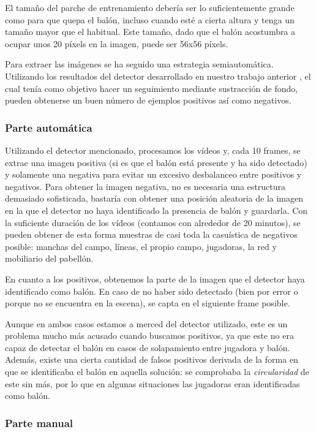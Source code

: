 El tamaño del parche de entrenamiento debería ser lo suficientemente grande como para que quepa el balón, incluso cuando esté a cierta altura y tenga un tamaño mayor que el habitual. Este tamaño, dado que el balón acostumbra a ocupar unos 20 píxels en la imagen, puede ser 56x56 píxels.

Para extraer las imágenes se ha seguido una estrategia semiautomática. Utilizando los resultados del detector desarrollado en nuestro trabajo anterior \cite{tfg}, el cual tenía como objetivo hacer un seguimiento mediante sustracción de fondo, pueden obtenerse un buen número de ejemplos positivos así como negativos.

\subsubsection*{Parte automática}

Utilizando el detector mencionado, procesamos los vídeos y, cada 10 frames, se extrae una imagen positiva (si es que el balón está presente y ha sido detectado) y solamente una negativa para evitar un excesivo desbalanceo entre positivos y negativos. Para obtener la imagen negativa, no es necesaria una estructura demasiado sofisticada, bastaría con obtener una posición aleatoria de la imagen en la que el detector no haya identificado la presencia de balón y guardarla. Con la suficiente duración de los vídeos (contamos con alrededor de 20 minutos), se pueden obtener de esta forma muestras de casi toda la casuística de negativos posible: manchas del campo, líneas, el propio campo, jugadoras, la red y mobiliario del pabellón.

En cuanto a los positivos, obtenemos la parte de la imagen que el detector haya identificado como balón. En caso de no haber sido detectado (bien por error o porque no se encuentra en la escena), se capta en el siguiente frame posible.

Aunque en ambos casos estamos a merced del detector utilizado, este es un problema mucho más acusado cuando buscamos positivos, ya que este no era capaz de detectar el balón en casos de solapamiento entre jugadora y balón. Además, existe una cierta cantidad de falsos positivos derivada de la forma en que se identificaba el balón en aquella solución: se comprobaba la \textit{circularidad} de este sin más, por lo que en algunas situaciones las jugadoras eran identificadas como balón.

\subsubsection*{Parte manual}

